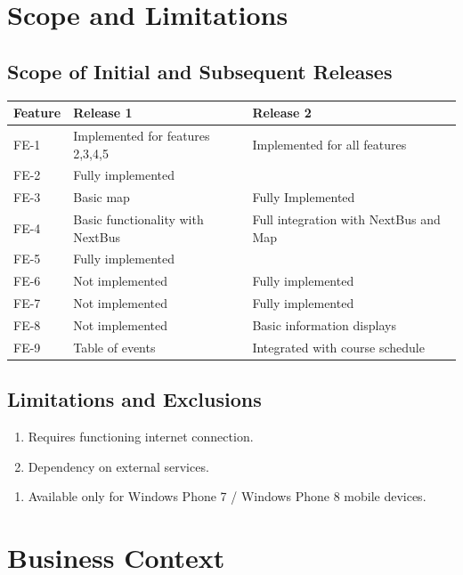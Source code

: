 \documentclass[pdftex,12pt,letter]{article}
\begin{document}
\section{Scope and Limitations}
\subsection{Scope of Initial and Subsequent Releases}
\begin{table}[!h]
\begin{tabularx}{\textwidth }[t]{|l|Y|Y|}
\hline
\bfseries Feature & \bfseries\hspace{1cm}Release 1 & \bfseries\hspace{1cm}Release 2\\ \hline
FE-1 & Implemented for features 2,3,4,5 & Implemented for all features\\ \hline
FE-2 & Fully implemented & ~\\ \hline
FE-3 & Basic map & Fully Implemented\\ \hline
FE-4 & Basic functionality with NextBus & Full integration with NextBus and Map\\ \hline
FE-5 & Fully implemented & ~ \\ \hline
FE-6 & Not implemented & Fully implemented\\ \hline
FE-7 & Not implemented & Fully implemented\\ \hline
FE-8 & Not implemented & Basic information displays\\ \hline
FE-9 & Table of events & Integrated with course schedule \\ \hline
\end{tabularx}
\end{table}
\FloatBarrier
\subsection{Limitations and Exclusions}
\begin{enumerate}[L{I}-1:]
\item Requires functioning internet connection.
\item Dependency on external services.
\end{enumerate}
\begin{enumerate}[EX-1:]
\item Available only for Windows Phone 7 / Windows Phone 8 mobile devices.
\end{enumerate}
\section{Business Context}
\end{document}
